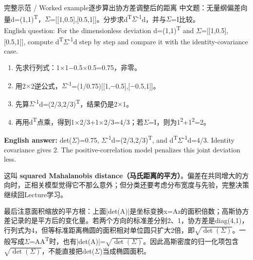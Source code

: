 \begin{StudyBlock}{完整示范 / Worked example}{逐步算出协方差调整后的距离}
中文题：无量纲偏差向量d=(1,1)\textsuperscript{T}，\ensuremath{\Sigma}=[[1,0.5],[0.5,1]]。分步求d\textsuperscript{T}\ensuremath{\Sigma}\textsuperscript{-}\textsuperscript{1}d，并与\ensuremath{\Sigma}=I比较。\\

English question: For the dimensionless deviation d=(1,1)\textsuperscript{T} and \ensuremath{\Sigma}=[[1,0.5],[0.5,1]], compute d\textsuperscript{T}\ensuremath{\Sigma}\textsuperscript{-}\textsuperscript{1}d step by step and compare it with the identity-covariance case.



\begin{enumerate}[start=1]

\item 先求行列式：1\ensuremath{\times}1\ensuremath{-}0.5\ensuremath{\times}0.5=0.75，非零。

\item 用2\ensuremath{\times}2逆公式，\ensuremath{\Sigma}\textsuperscript{-}\textsuperscript{1}=(1/0.75)[[1,\ensuremath{-}0.5],[\ensuremath{-}0.5,1]]。

\item 先算\ensuremath{\Sigma}\textsuperscript{-}\textsuperscript{1}d=(2/3,2/3)\textsuperscript{T}，结果仍是2\ensuremath{\times}1。

\item 再用d\textsuperscript{T}点乘，得到1\ensuremath{\times}2/3+1\ensuremath{\times}2/3=4/3；若\ensuremath{\Sigma}=I，则为1\textsuperscript{2}+1\textsuperscript{2}=2。

\end{enumerate}


\textbf{English answer:} det(\ensuremath{\Sigma})=0.75, \ensuremath{\Sigma}\textsuperscript{-}\textsuperscript{1}d=(2/3,2/3)\textsuperscript{T}, and d\textsuperscript{T}\ensuremath{\Sigma}\textsuperscript{-}\textsuperscript{1}d=4/3. Identity covariance gives 2. The positive-correlation model penalizes this joint deviation less.
\end{StudyBlock}


这叫 \textbf{squared Mahalanobis distance（马氏距离的平方）}。偏差在共同增大的方向时，正相关模型觉得它不那么意外；但分类还要考虑分布宽度与先验，完整决策继续回Lecture学习。


最后注意面积缩放的平方根：上面|det(A)|是坐标变换x=Az的面积倍数；高斯协方差记录的是平方后的变化量。若两个方向的标准差分别2、1，协方差是diag(4,1)，行列式为4，但等标准距离椭圆的面积相对单位圆只扩大2倍，即\(\sqrt{\det(\Sigma)}\)。一般写成\ensuremath{\Sigma}=AA\textsuperscript{T}时，也有|det(A)|=\(\sqrt{\det(\Sigma)}\)。因此高斯密度的归一化项包含\(\sqrt{\det(\Sigma)}\)，不能直接把det(\ensuremath{\Sigma})当成椭圆面积。



